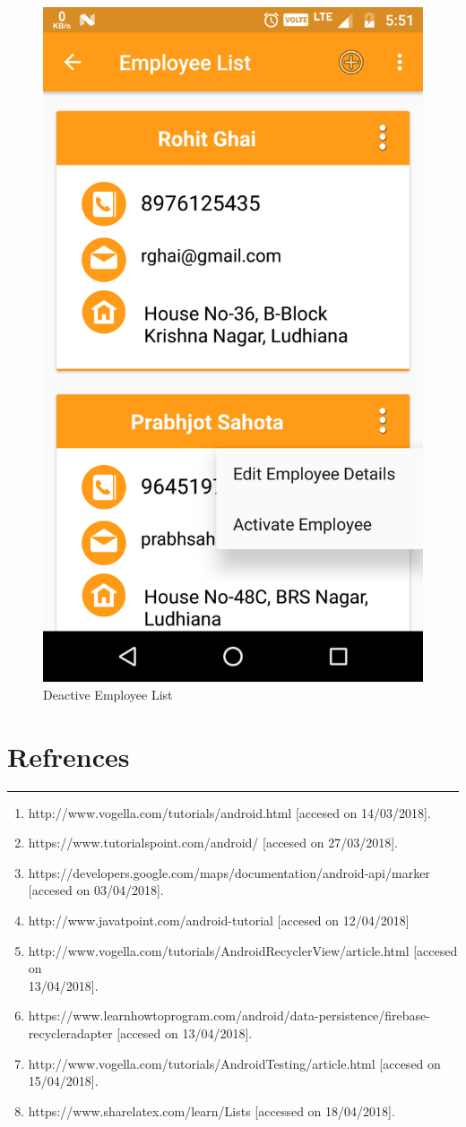 \\
\begin{figure}[h]
	\centering
	\includegraphics[width=0.7\linewidth]{DeactiveEmployeeList}
	\caption{Deactive Employee List}
\end{figure}
\pagebreak


\chapter{Refrences}\hrule
\label{Chapter:6}
\begin{enumerate}
	\item http://www.vogella.com/tutorials/android.html [accesed on 14/03/2018].
	\item https://www.tutorialspoint.com/android/ [accesed on 27/03/2018].
	\item https://developers.google.com/maps/documentation/android-api/marker [accesed on 03/04/2018].
	\item http://www.javatpoint.com/android-tutorial [accesed on 12/04/2018]
	\item http://www.vogella.com/tutorials/AndroidRecyclerView/article.html [accesed on \\13/04/2018].
	\item https://www.learnhowtoprogram.com/android/data-persistence/firebase-recycleradapter [accesed on 13/04/2018].
	\item 
	http://www.vogella.com/tutorials/AndroidTesting/article.html
	[accesed on 15/04/2018].
	\item 
	https://www.sharelatex.com/learn/Lists [accessed on 18/04/2018].
	\pagebreak
\end{enumerate}